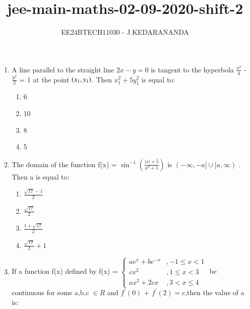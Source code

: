 \documentclass[journal]{IEEEtran}
\renewcommand{\thefigure}{\theenumi}
\renewcommand{\thetable}{\theenumi}
\numberwithin{equation}{enumi}
\numberwithin{figure}{enumi}
\renewcommand{\thetable}{\theenumi}
\begin{document}

\vspace{3cm}

\title{jee-main-maths-02-09-2020-shift-2}
\author{EE24BTECH11030 - J.KEDARANANDA}
{\let\newpage\relax\maketitle}
\renewcommand{\thefigure}{\theenumi}
\renewcommand{\thetable}{\theenumi}
\begin{enumerate}
    \item A line parallel to the straight line $2x-y=0$ is tangent to the hyperbola $\frac{x^2}{4}$ - $\frac{y^2}{2}$ = 1 at the point $\left(x_1,y_1\right)$. Then $x_1^2 + 5y_1^2$ is equal to: \\
    \begin{multicols}{4}
    \begin{enumerate}
        \item 6
        \item 10
        \item 8
        \item 5
    \end{enumerate}
    \end{multicols}
    \item The domain of the function f(x) = $\sin^{-1}\left(\frac{|x| + 5}{x^2 + 1}\right)$ is $(-\infty,-a]\cup[a,\infty)$ . Then a is equal to: \\
    \begin{multicols}{4}
    \begin{enumerate}
        \item $\frac{\sqrt{17}-1}{2}$
        \item $\frac{\sqrt{17}}{2}$
        \item $\frac{1 + \sqrt{17}}{2}$
        \item $\frac{\sqrt{17}}{2} + 1$
    \end{enumerate} 
    \end{multicols}
    \item If a function f(x) defined by f(x) = $\left\{\begin{array}{ll}ae^x + be^{-x}& ,  -1 \leq x < 1 \\cx^2 & ,  1 \leq x < 3 \\ax^2 + 2cx & ,  3 < x \leq 4\end{array}\right.$ be continuous for some a,b,c $\in R$ and $f^{\prime}(0)$ + $f^{\prime}(2) = e$,then the value of a is: \\

\end{enumerate}
\end{document}
